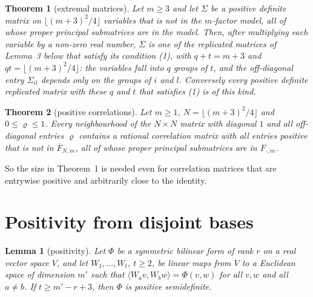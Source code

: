 \documentclass[11pt,letterpaper,reqno]{amsart}
\theoremstyle{spaced}
\newtheorem{theorem}{Theorem}
\newtheorem{lemma}{Lemma}
\begin{document}
\begin{theorem}[extremal matrices]
Let \(m \ge 3\) and let \(\Sigma\) be a positive definite matrix on \(\lfloor (m+3)^2/4 \rfloor\) variables that is not in the \(m\)-factor model, all of whose proper principal submatrices are in the model. Then, after multiplying each variable by a non-zero real number, \(\Sigma\) is one of the replicated matrices of Lemma~3 below that satisfy its condition (1), with \(q + t = m+3\) and \(qt = \lfloor (m+3)^2/4 \rfloor\): the variables fall into \(q\) groups of \(t\), and the off-diagonal entry \(\Sigma_{il}\) depends only on the groups of \(i\) and \(l\). Conversely every positive definite replicated matrix with these \(q\) and \(t\) that satisfies (1) is of this kind.
\end{theorem}

\begin{theorem}[positive correlations]
Let \(m \ge 1\), \(N = \lfloor (m+3)^2/4 \rfloor\) and \(0 \le \varrho \le 1\). Every neighbourhood of the \(N \times N\) matrix with diagonal \(1\) and all off-diagonal entries \(\varrho\) contains a rational correlation matrix with all entries positive that is not in \(\overline{F}_{N,m}\), all of whose proper principal submatrices are in \(F_{\cdot,m}\).
\end{theorem}

So the size in Theorem~1 is needed even for correlation matrices that are entrywise positive and arbitrarily close to the identity.

\newpage\hypertarget{positivity-from-disjoint-bases}{%
\section{Positivity from disjoint bases}\label{positivity-from-disjoint-bases}}

\begin{lemma}[positivity]
Let \(\Phi\) be a symmetric bilinear form of rank \(r\) on a real vector space \(V\), and let \(W_1, \dots, W_t\), \(t \ge 2\), be linear maps from \(V\) to a Euclidean space of dimension \(m'\) such that \(\langle W_a v, W_b w\rangle = \Phi(v, w)\) for all \(v, w\) and all \(a \ne b\). If \(t \ge m' - r + 3\), then \(\Phi\) is positive semidefinite.
\end{lemma}
\end{document}
